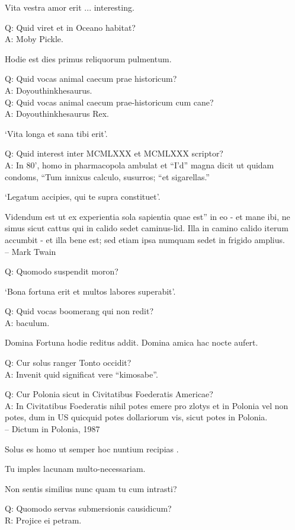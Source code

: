 \documentclass[titlepage,12pt]{memoir}
\begin{document}
Vita vestra amor erit ... interesting.

Q: Quid viret et in Oceano habitat?\\
A: Moby Pickle.

Hodie est dies primus reliquorum pulmentum.

Q: Quid vocas animal caecum prae historicum?\\
A: Doyouthinkhesaurus.\\
Q: Quid vocas animal caecum prae-historicum cum cane?\\
A: Doyouthinkhesaurus Rex.

‘Vita longa et sana tibi erit’.

Q: Quid interest inter MCMLXXX et MCMLXXX scriptor?\\
A: In 80’, homo in pharmacopola ambulat et “I’d” magna dicit
ut quidam condoms, “Tum innixus calculo, susurros;
“et sigarellas.”

‘Legatum accipies, qui te supra constituet’.

Videndum est ut ex experientia sola sapientia quae est”
in eo - et mane ibi, ne simus sicut cattus qui in calido sedet
caminus-lid. Illa in camino calido iterum accumbit - et illa
bene est; sed etiam ipsa numquam sedet in frigido amplius.
\\-- Mark Twain

Q: Quomodo suspendit moron?

‘Bona fortuna erit et multos labores superabit’.

Q: Quid vocas boomerang qui non redit?\\
A: baculum.

Domina Fortuna hodie reditus addit. Domina amica hac nocte aufert.

Q: Cur solus ranger Tonto occidit?\\
A: Invenit quid significat vere “kimosabe”.

Q: Cur Polonia sicut in Civitatibus Foederatis Americae?\\
A: In Civitatibus Foederatis nihil potes emere pro zlotys et in
Polonia vel non potes, dum in US quicquid potes
dollariorum vis, sicut potes in Polonia.
\\-- Dictum in Polonia, 1987

 Solus es homo ut semper hoc nuntium recipias .

Tu imples lacunam multo-necessariam.

Non sentis similius nunc quam tu cum intrasti?

Q: Quomodo servas submersionis causidicum?\\
R: Projice ei petram.
\end{document}
